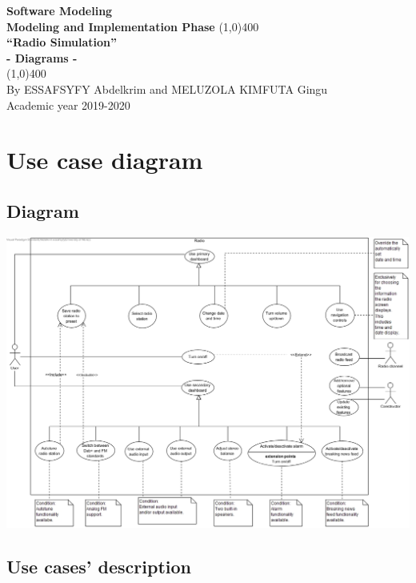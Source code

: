 \documentclass[11pt]{article}
\begin{document}
\begin{titlepage}
\begin{center}
\vspace*{1cm}
\Large{\textbf{Software Modeling}}\\
\Large{\textbf{Modeling and Implementation Phase}}
\vfill
\line(1,0){400}\\[1mm]
\huge{\textbf{“Radio Simulation”}}\\[3mm]
\Large{\textbf{- Diagrams -}}\\[1mm]
\line(1,0){400}\\
\vfill
By ESSAFSYFY Abdelkrim and MELUZOLA KIMFUTA Gingu\\
Academic year 2019-2020
\end{center}
\end{titlepage}

\tableofcontents
\thispagestyle{empty}
\clearpage
\setcounter{page}{1}

\section{Use case diagram}
\subsection{Diagram}
\vspace{10px}
\begin{center}
\includegraphics[width=15cm]{../Diagrams/useCase-v3.jpg}\\
\end{center}

\subsection{Use cases' description}
\end{document}
